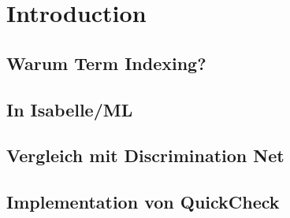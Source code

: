 \chapter{Introduction}\label{chapter:introduction}
\section{Warum Term Indexing?}
\section{In Isabelle/ML}
\section{Vergleich mit Discrimination Net}
\section{Implementation von QuickCheck}
